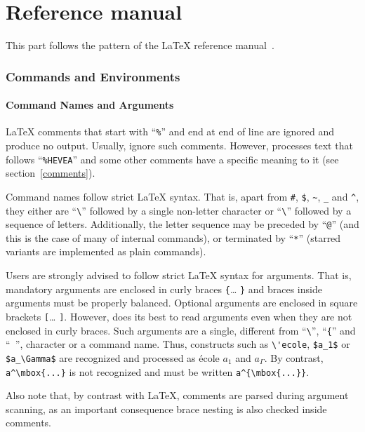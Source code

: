 \part{\label{referencemanual}Reference manual}
This part follows the pattern of the \LaTeX{} reference
manual~\cite[Appendix~C]{latex}.

\section{Commands and Environments}

\subsection{Command Names and Arguments}

\LaTeX{} comments that start with ``\verb+%+'' %
and end at end of line are ignored and produce no output.
Usually, \hevea{} ignore such comments. However, \hevea{} processes
text that follows ``\verb+%HEVEA+'' %
and some other comments have a specific meaning to it (see
section~\ref{comments}).

Command names follow strict \LaTeX{} syntax. That is, apart from
\verb+#+, \verb+$+, %
\verb+~+, \verb+_+ and \verb+^+, they either are
``\verb+\+'' followed by a single non-letter character or
``\verb+\+'' followed by a sequence of letters.
Additionally, the letter sequence may be preceded by ``\verb+@+''
(and this is the case of many of \hevea{} internal commands), or
terminated by ``\verb+*+'' (starred variants are implemented as plain
commands).

Users are strongly advised to follow strict \LaTeX{} syntax for
arguments. That is, mandatory arguments are enclosed in curly braces
\verb+{+\ldots{} \verb+}+ and braces inside arguments must be properly
balanced.
Optional arguments are enclosed in square brackets \verb+[+\ldots{}
\verb+]+.
However, \hevea{} does its best to read arguments even when they are
not enclosed in curly braces.
Such arguments are a single, different from ``\verb+\+'', ``\verb+{+''
and ``\verb+ +'', character or
a command name.
Thus, constructs such as \verb+\'ecole+,
\verb+$a_1$+ or \verb+$a_\Gamma$+ are
recognized and processed as \'ecole $a_1$ and $a_\Gamma$.
By contrast, \verb+a^\mbox{...}+ is not recognized
and must be written  \verb+a^{\mbox{...}}+.

Also note that, by contrast with \LaTeX{}, comments are parsed during
argument scanning, as an important consequence brace nesting is also
checked inside comments.

